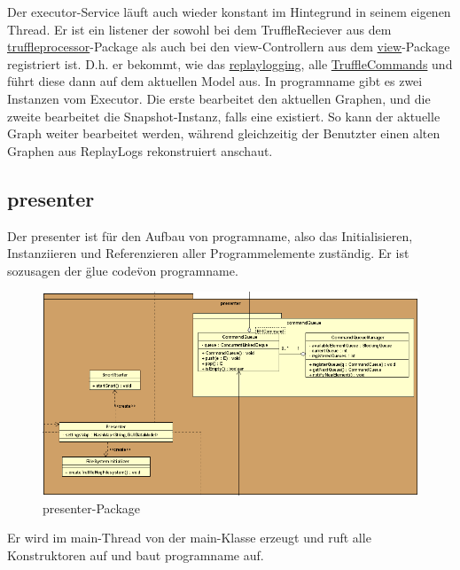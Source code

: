     Der executor-Service läuft auch wieder konstant im Hintegrund in seinem
    eigenen Thread. Er ist ein \gls{listener} der sowohl bei dem TruffleReciever aus dem
    \hyperref[subsubsec:truffleprocessor]{truffleprocessor}-Package als
    auch bei den view-Controllern aus dem \hyperref[subsec:view]{view}-Package
    registriert ist. D.h. er bekommt, wie das \hyperref[subsubsec:replaylogging]{replaylogging},
    alle \hyperref[subsubsec:trufflecommand]{TruffleCommands} und führt diese
    dann auf dem aktuellen Model aus.
    \newline
    \newline
    In \gls{programname} gibt es zwei Instanzen vom Executor. Die erste bearbeitet
    den aktuellen Graphen, und die zweite bearbeitet die Snapshot-Instanz, falls
    eine existiert. So kann der aktuelle Graph weiter bearbeitet werden, während
    gleichzeitig der Benutzter einen alten Graphen aus 
    ReplayLogs rekonstruiert anschaut.


\subsection{presenter}
\label{subsec:presenter}

Der presenter ist für den Aufbau von \gls{programname}, also das
Initialisieren, Instanziieren und Referenzieren aller Programmelemente zuständig.
Er ist sozusagen der \"glue code\" von \gls{programname}.

\begin{figure}[H]
  \centering
  \includegraphics[width=\textwidth]{../diagramimages/presenter.png}
  \caption{presenter-Package}
\end{figure}

Er wird im main-Thread von der main-Klasse erzeugt und ruft alle Konstruktoren auf
und baut \gls{programname} auf.

